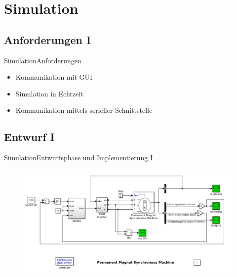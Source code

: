 \section{Simulation}
	
	\subsection{Anforderungen I}
	\begin{frame}{Simulation}{Anforderungen}
	  \begin{itemize}
	    \item Kommunikation mit GUI
	    \item Simulation in Echtzeit
	    \item Kommunikation mittels serieller Schnittstelle
	  \end{itemize}
	\end{frame}

	\subsection{Entwurf I}
	\begin{frame}{Simulation}{Entwurfsphase und Implementierung I}
	  	\begin{figure}[htbp]
	  		\centering
	  		\includegraphics[width=\textwidth]{../sim/pictures/powerPmmotor.png}
	  	\end{figure}
	\end{frame}

